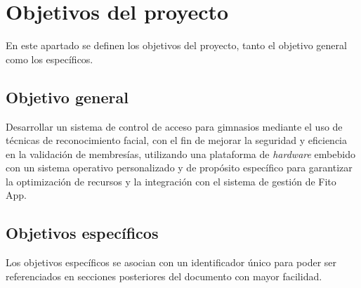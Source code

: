 \section{Objetivos del proyecto}
En este apartado se definen los objetivos del proyecto, tanto el objetivo general como los específicos. 





\subsection{Objetivo general}
Desarrollar un sistema de control de acceso para gimnasios mediante el uso de técnicas de reconocimiento facial, con el fin de mejorar la seguridad y eficiencia en la validación de membresías, utilizando una plataforma de \textit{hardware} embebido con un sistema operativo personalizado y de propósito específico para garantizar la optimización de recursos y la integración con el sistema de gestión de Fito App.


\subsection{Objetivos específicos}\label{secc:objectives}
Los objetivos específicos se asocian con un identificador único para poder ser referenciados en secciones posteriores del documento con mayor facilidad.

